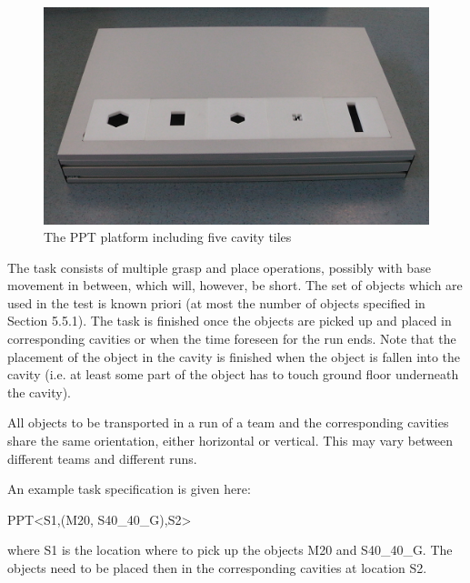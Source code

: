 \begin{figure}
\includegraphics[width= \textwidth ]{../images/ppt_plattform.jpg}
\caption{The PPT platform including five cavity tiles}
\label{fig:ppt_plattform}
\end{figure}

The task consists of multiple grasp and place operations, possibly with base movement in between, which will, however, be short. The set of objects which are used in the test is known priori (at most the number of objects specified in Section 5.5.1). The task is finished once the objects are picked up and placed in corresponding cavities or when the time foreseen for the run ends. Note that the placement of the object in the cavity is finished when the object is fallen into the cavity (i.e. at least some part of the object has to touch ground floor underneath the cavity).
\par
All objects to be transported in a run of a team and the corresponding cavities share the same orientation, either horizontal or vertical. This may vary between different teams and different runs.
\par
An example task specification is given here:
\par
PPT\textless S1,(M20, S40\_40\_G),S2\textgreater
\par
where S1 is the location where to pick up the objects M20 and S40\_40\_G. The objects need to be placed then in the corresponding cavities at location S2.
%
%
%

